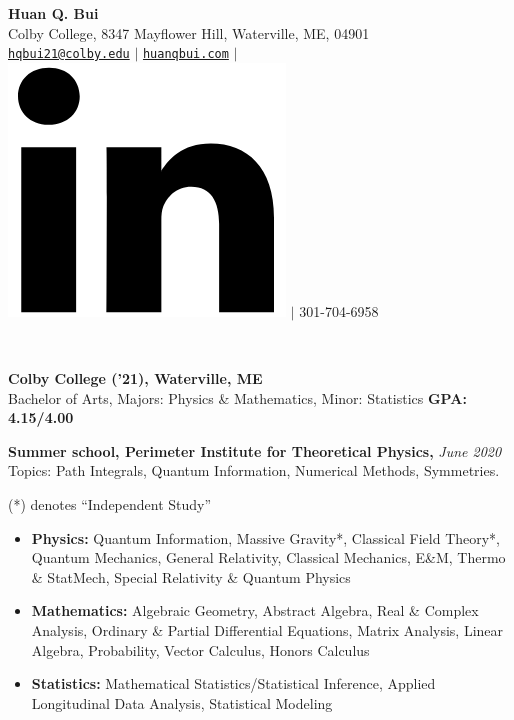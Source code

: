 \documentclass[letter, 10pt]{article}
\newcommand{\longunderline}[1]{\uline{#1\hfill\mbox{}}}
\begin{document}
	\begin{center}
		{\LARGE\textbf{Huan Q. Bui}}\\
		\smallskip
		Colby College, 8347 Mayflower Hill, Waterville, ME, 04901\\ \href{mailto:hqbui21@colby.edu}{\texttt{hqbui21@colby.edu}} $\vert$ \href{https://huanqbui.com}{\texttt{huanqbui.com}} $\vert$ \href{https://www.linkedin.com/in/huan-bui/}{\includegraphics[scale=0.04]{linkedin_logo.PNG}} $\vert$ 301-704-6958
	\end{center}
	\noindent \longunderline{\normalsize{{}}}\\
	\vspace{-7pt}
	
	
			\noindent \textbf{Colby College ('21), Waterville, ME}\\
			Bachelor of Arts, {Majors}: Physics \& Mathematics, {Minor}: Statistics \hfill \textbf{GPA: 4.15/4.00}\\
			\vspace{-7pt}
			
			
			\noindent \textbf{Summer school, Perimeter Institute for Theoretical Physics,} \textit{June 2020}\\
			\noindent Topics: Path Integrals, Quantum Information, Numerical Methods, Symmetries.\\
			\vspace{-7pt}

			 (*) denotes ``Independent Study''
			\begin{itemize}[noitemsep, nolistsep]
				\item \textbf{Physics:} Quantum Information,  Massive Gravity*, Classical Field Theory*, Quantum Mechanics, General Relativity, Classical Mechanics, E\&M, Thermo \& StatMech, Special Relativity \& Quantum Physics
				\item \textbf{Mathematics:} Algebraic Geometry, Abstract Algebra, Real \& Complex Analysis, Ordinary \& Partial Differential Equations, Matrix Analysis, Linear Algebra, Probability, Vector Calculus, Honors Calculus
				\item \textbf{Statistics:} Mathematical Statistics/Statistical Inference, Applied Longitudinal Data Analysis, Statistical Modeling\\
			\end{itemize}
 
\end{document}
